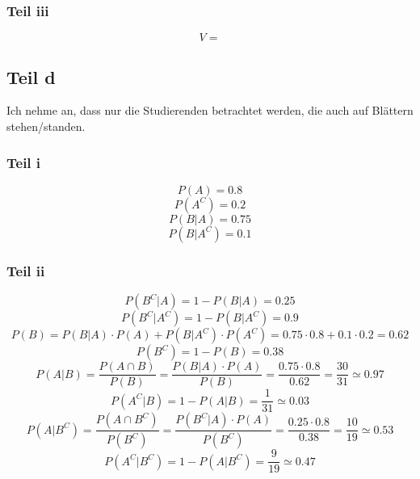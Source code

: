\documentclass[10pt,a4paper]{article}
\begin{document}
\subsubsection{Teil iii}

\begin{equation}
  V =
\end{equation}

\subsection{Teil d}

Ich nehme an, dass nur die Studierenden betrachtet werden, die auch auf Blättern stehen/standen.

\subsubsection{Teil i}

\begin{equation}
  P(A) = 0.8
\end{equation}
\begin{equation}
  P(A^{C}) = 0.2
\end{equation}
\begin{equation}
  P(B | A) = 0.75
\end{equation}
\begin{equation}
  P(B | A^{C}) = 0.1
\end{equation}

\subsubsection{Teil ii}

\begin{equation}
  P(B^{C} | A) = 1 - P(B | A) = 0.25
\end{equation}
\begin{equation}
  P(B^{C} | A^{C}) = 1 - P(B | A^{C}) = 0.9
\end{equation}
\begin{equation}
  P(B) = P(B | A) \cdot P(A) + P(B | A^{C}) \cdot P(A^{C}) = 0.75 \cdot 0.8 + 0.1 \cdot 0.2 = 0.62
\end{equation}
\begin{equation}
  P(B^{C}) = 1 - P(B) = 0.38
\end{equation}
\begin{equation}
  P(A | B) = \frac{P(A \cap B)}{P(B)} = \frac{P(B | A) \cdot P(A)}{P(B)} = \frac{0.75 \cdot 0.8}{0.62} = \frac{30}{31} \simeq 0.97
\end{equation}
\begin{equation}
  P(A^{C} | B) = 1 - P(A | B) = \frac{1}{31} \simeq 0.03
\end{equation}
\begin{equation}
  P(A | B^{C}) = \frac{P(A \cap B^{C})}{P(B^{C})} = \frac{P(B^{C} | A) \cdot P(A)}{P(B^{C})} = \frac{0.25 \cdot 0.8}{0.38} = \frac{10}{19} \simeq 0.53
\end{equation}
\begin{equation}
  P(A^{C} | B^{C}) = 1 - P(A | B^{C}) = \frac{9}{19} \simeq 0.47
\end{equation}
\end{document}
